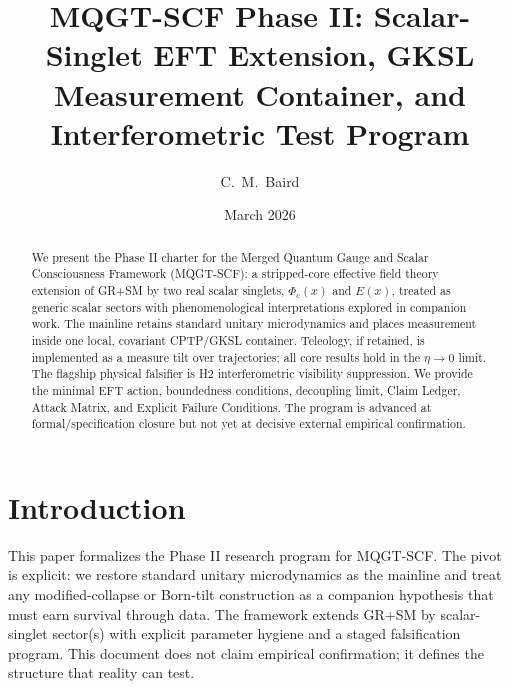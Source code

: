 \documentclass[reprint,amsmath,amssymb,aps,showkeys]{revtex4-2}
\title{MQGT-SCF Phase II: Scalar-Singlet EFT Extension, GKSL Measurement Container, and Interferometric Test Program}
\author{C.~M.~Baird}
\affiliation{Independent Researcher}
\date{March 2026}
\newcommand{\Phic}{\Phi_{\mathrm{c}}}
\begin{document}
\maketitle

\begin{abstract}
We present the Phase II charter for the Merged Quantum Gauge and Scalar Consciousness Framework (MQGT-SCF): a stripped-core effective field theory extension of GR+SM by two real scalar singlets, $\Phic(x)$ and $E(x)$, treated as generic scalar sectors with phenomenological interpretations explored in companion work. The mainline retains standard unitary microdynamics and places measurement inside one local, covariant CPTP/GKSL container. Teleology, if retained, is implemented as a measure tilt over trajectories; all core results hold in the $\eta\to 0$ limit. The flagship physical falsifier is H2 interferometric visibility suppression. We provide the minimal EFT action, boundedness conditions, decoupling limit, Claim Ledger, Attack Matrix, and Explicit Failure Conditions. The program is advanced at formal/specification closure but not yet at decisive external empirical confirmation.
\end{abstract}

\section{Introduction}
This paper formalizes the Phase II research program for MQGT-SCF. The pivot is explicit: we restore standard unitary microdynamics as the mainline and treat any modified-collapse or Born-tilt construction as a companion hypothesis that must earn survival through data. The framework extends GR+SM by scalar-singlet sector(s) with explicit parameter hygiene and a staged falsification program. This document does not claim empirical confirmation; it defines the structure that reality can test.

\end{document}
